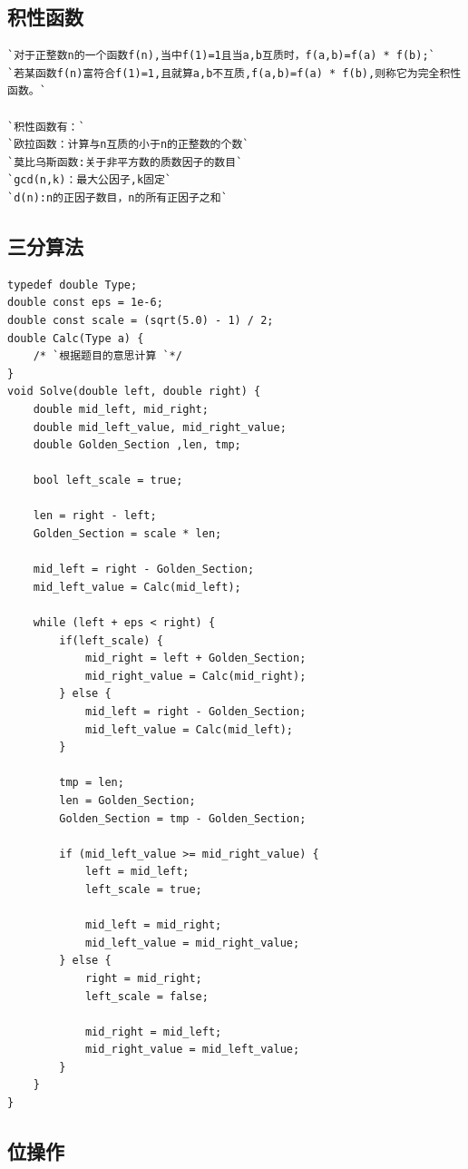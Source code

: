 \documentclass[a4paper]{article}
\begin{document}
\begin{CJK*}{UTF8}{gbsn}
\begin{multicols}{3}
\begin{flushleft}
\subsection{积性函数}
\begin{lstlisting}
`对于正整数n的一个函数f(n),当中f(1)=1且当a,b互质时，f(a,b)=f(a) * f(b);`
`若某函数f(n)富符合f(1)=1,且就算a,b不互质,f(a,b)=f(a) * f(b),则称它为完全积性函数。`

`积性函数有：`
`欧拉函数：计算与n互质的小于n的正整数的个数`
`莫比乌斯函数:关于非平方数的质数因子的数目`
`gcd(n,k)：最大公因子,k固定`
`d(n):n的正因子数目，n的所有正因子之和`
\end{lstlisting}

\subsection{三分算法}
\begin{lstlisting}
typedef double Type;
double const eps = 1e-6;
double const scale = (sqrt(5.0) - 1) / 2;
double Calc(Type a) {
    /* `根据题目的意思计算 `*/
}
void Solve(double left, double right) {
    double mid_left, mid_right;
    double mid_left_value, mid_right_value;
    double Golden_Section ,len, tmp;

    bool left_scale = true;

    len = right - left;
    Golden_Section = scale * len;

    mid_left = right - Golden_Section;
    mid_left_value = Calc(mid_left);

    while (left + eps < right) {
        if(left_scale) {
            mid_right = left + Golden_Section;
            mid_right_value = Calc(mid_right);
        } else {
            mid_left = right - Golden_Section;
            mid_left_value = Calc(mid_left);
        }

        tmp = len;
        len = Golden_Section;
        Golden_Section = tmp - Golden_Section;

        if (mid_left_value >= mid_right_value) {
            left = mid_left;
            left_scale = true;

            mid_left = mid_right;
            mid_left_value = mid_right_value;
        } else {
            right = mid_right;
            left_scale = false;

            mid_right = mid_left;
            mid_right_value = mid_left_value;
        }
    }
}
\end{lstlisting}

\subsection{位操作}


\end{flushleft}
\end{multicols}
\end{CJK*}
\end{document}

